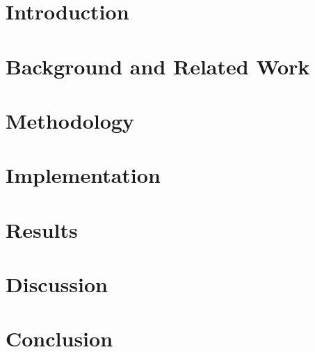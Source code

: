 



\newpage

\newpage


\clearpage

\tableofcontents
\listoffigures
\listoftables
\lstlistoflistings

\newpage

\chapter{Introduction}


\chapter{Background and Related Work}


\chapter{Methodology}


\chapter{Implementation}


\chapter{Results}


\chapter{Discussion}


\chapter{Conclusion}



